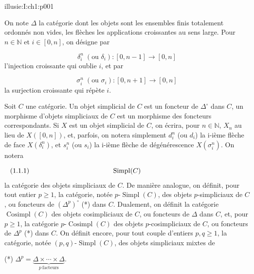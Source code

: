 \IllusieSetPhysicalPageSize{450.6bp}{704bp}
\begin{illusiebodypage}{illusie:I:ch1:p001}
\hypertarget{illusie:I:ch1}{}%
\hypertarget{illusie:I:ch1:s1}{}%
\hypertarget{illusie:I:ch1:s1:1}{}%

\hypertarget{illusie:I:ch1:s1:1:p1}{}%
On note $\Delta$ la catégorie dont les objets sont les ensembles finis
totalement ordonnés non vides, les flèches les applications croissantes au sens
large. Pour $n\in\mathbb{N}$ et $i\in[0,n]$, on désigne par

\hypertarget{illusie:I:ch1:s1:1:d1}{}%
\[
  \delta_i^n\; (\text{ou }\delta_i):[0,n-1]\longrightarrow[0,n]
\]
l'injection croissante qui oublie $i$, et par

\hypertarget{illusie:I:ch1:s1:1:d2}{}%
\[
  \sigma_i^n\; (\text{ou }\sigma_i):[0,n+1]\longrightarrow[0,n]
\]
la surjection croissante qui répète $i$.

\hypertarget{illusie:I:ch1:s1:1:p2}{}%
Soit $C$ une catégorie. Un objet simplicial de $C$ est un foncteur de
$\Delta^{\circ}$ dans $C$, un morphisme d'objets simpliciaux de $C$ est un
morphisme des foncteurs correspondants. Si $X$ est un objet simplicial de $C$,
on écrira, pour $n\in\mathbb{N}$, $X_n$ au lieu de $X([0,n])$, et, parfois, on
notera simplement $d_i^n$ (ou $d_i$) la i-ième flèche de face
$X(\delta_i^n)$, et $s_i^n$ (ou $s_i$) la i-ième flèche de dégénérescence
$X(\sigma_i^n)$. On notera

\hypertarget{illusie:I:ch1:s1:1:eq1}{}%
\[
  \makebox[\linewidth][s]{\text{(1.1.1)}\hfill$\operatorname{Simpl}(C)$\hfill\phantom{\text{(1.1.1)}}}
\]
la catégorie des objets simpliciaux de $C$. De manière analogue, on définit,
pour tout entier $p\geq1$, la catégorie, notée
$p\text{-}\operatorname{Simpl}(C)$, des objets $p$-simpliciaux de $C$, ou
foncteurs de $(\Delta^p)^{\circ}$ (*) dans $C$. Dualement, on définit la
catégorie $\operatorname{Cosimpl}(C)$ des objets cosimpliciaux de $C$, ou
foncteurs de $\Delta$ dans $C$, et, pour $p\geq1$, la catégorie
$p\text{-}\operatorname{Cosimpl}(C)$ des objets $p$-cosimpliciaux de $C$, ou
foncteurs de $\Delta^p$ (*) dans $C$. On définit encore, pour tout couple
d'entiers $p,q\geq1$, la catégorie, notée
$(p,q)\text{-}\operatorname{Simpl}(C)$, des objets simpliciaux mixtes de

\vfill
{}\hypertarget{illusie:I:ch1:s1:1:n1}{}%
{\fontsize{8}{9.5}\selectfont\noindent
(*) $\displaystyle \Delta^p=\underbrace{\Delta\times\cdots\times\Delta}_{p\ \text{facteurs}}$.}
\end{illusiebodypage}
